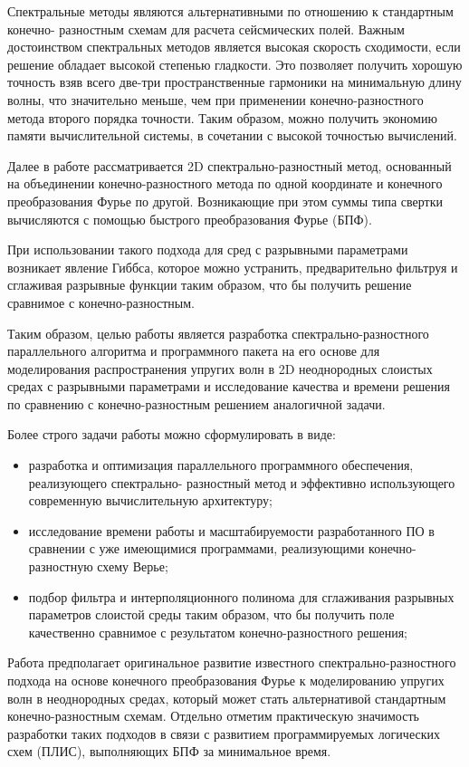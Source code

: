 Спектральные методы являются альтернативными по отношению к стандартным конечно-
разностным схемам для расчета сейсмических полей. Важным достоинством
спектральных методов является высокая скорость сходимости, если решение обладает
высокой степенью гладкости. Это позволяет получить хорошую точность взяв всего две-три
пространственные гармоники на минимальную длину волны, что значительно меньше, 
чем при применении конечно-разностного метода второго порядка точности.
Таким образом, можно получить экономию памяти вычислительной системы, в сочетании с высокой точностью вычислений.

Далее в работе рассматривается 2D спектрально-разностный метод, основанный на
объединении конечно-разностного метода по одной координате и конечного
преобразования Фурье по другой. Возникающие при этом суммы
типа свертки вычисляются с помощью быстрого преобразования Фурье (БПФ).

При использовании такого подхода для сред с разрывными параметрами возникает явление Гиббса,
которое можно устранить, предварительно фильтруя и сглаживая разрывные функции таким образом,
что бы получить решение сравнимое с конечно-разностным.

Таким образом, целью работы является разработка спектрально-разностного
параллельного алгоритма и программного пакета на его основе для моделирования распространения
упругих волн в 2D неоднородных слоистых средах с разрывными параметрами и
исследование качества и времени решения по сравнению с конечно-разностным решением
аналогичной задачи.

Более строго задачи работы можно сформулировать в виде:
\begin{itemize}
    \item разработка и
оптимизация параллельного программного обеспечения, реализующего спектрально-
разностный метод и эффективно использующего современную вычислительную
архитектуру;
    \item исследование времени работы и масштабируемости разработанного ПО в
сравнении с уже имеющимися программами, реализующими конечно-разностную схему
Верье;
    \item подбор фильтра и интерполяционного полинома для
сглаживания разрывных параметров слоистой среды таким образом, что бы получить поле
качественно сравнимое с результатом конечно-разностного решения;
\end{itemize}

Работа предполагает оригинальное развитие известного спектрально-разностного подхода
на основе конечного преобразования Фурье к моделированию упругих волн в
неоднородных средах, который может стать альтернативой стандартным конечно-разностным схемам.
Отдельно отметим практическую значимость разработки таких подходов в связи с развитием
программируемых логических схем (ПЛИС), выполняющих БПФ за минимальное время.

\clearpage